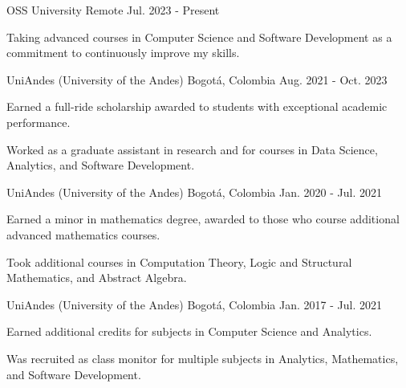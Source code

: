 

\begin{cventries}

	{OSS University} %
	{Remote} %
	{Jul. 2023 {-} Present} %
	{
		\begin{cvitems} %
			\item {Taking advanced courses in Computer Science and Software Development as a commitment to continuously improve my skills.}
		\end{cvitems}
	}

	{UniAndes (University of the Andes)} %
	{Bogotá, Colombia} %
	{Aug. 2021 {-} Oct. 2023} %
	{
		\begin{cvitems} %
			\item {Earned a full-ride scholarship awarded to students with exceptional academic performance.}
			\item {Worked as a graduate assistant in research and for courses in Data Science, Analytics, and Software Development.}
		\end{cvitems}
	}

	{UniAndes (University of the Andes)} %
	{Bogotá, Colombia} %
	{Jan. 2020 {-} Jul. 2021} %
	{
		\begin{cvitems} %
			\item {Earned a minor in mathematics degree, awarded to those who course additional advanced mathematics courses.}
			\item {Took additional courses in Computation Theory, Logic and Structural Mathematics, and Abstract Algebra.}
		\end{cvitems}
	}

	{UniAndes (University of the Andes)} %
	{Bogotá, Colombia} %
	{Jan. 2017 {-} Jul. 2021} %
	{
		\begin{cvitems} %
			\item {Earned additional credits for subjects in Computer Science and Analytics.}
			\item {Was recruited as class monitor for multiple subjects in Analytics, Mathematics, and Software Development.}
		\end{cvitems}
	}

\end{cventries}
